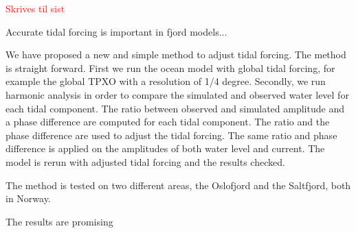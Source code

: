 \textcolor{Red}{Skrives til sist}

Accurate tidal forcing is important in fjord models...

We have proposed a new and simple method to adjust tidal forcing. The method is straight forward. First we run the ocean model with global tidal forcing, for example the global TPXO with a resolution of 1/4 degree. Secondly, we run harmonic analysis in order to compare the simulated and observed water level for each tidal component. The ratio between observed and simulated amplitude and a phase difference are computed for each tidal component. The ratio and the phase difference are used to adjust the tidal forcing. The same ratio and phase difference is applied on the amplitudes of both water level and current. The model is rerun with adjusted tidal forcing and the results checked.

The method is tested on two different areas, the Oslofjord and the Saltfjord, both in Norway.
 
The results are promising 





